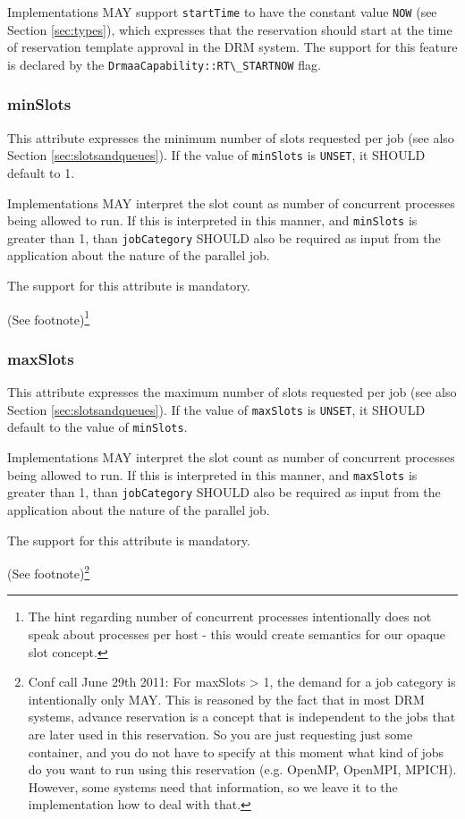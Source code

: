\documentclass{article}
\newcommand{\h}[1]{\lstinline|#1|}
\newcommand{\rat}[1]{ {\tiny(See footnote)}\footnote{#1} }
\begin{document}
Implementations MAY support \h{startTime} to have the constant value \h{NOW} (see Section \ref{sec:types}), which expresses that the reservation should start at the time of reservation template approval in the DRM system. The support for this feature is declared by the \h{DrmaaCapability::RT\_STARTNOW} flag. 

\subsubsection{minSlots}

This attribute expresses the minimum number of slots requested per job (see also Section \ref{sec:slotsandqueues}). If the value of \h{minSlots} is \h{UNSET}, it SHOULD default to 1.

Implementations MAY interpret the slot count as number of concurrent processes being allowed to run. If this is interpreted in this manner, and \h{minSlots} is greater than 1, than \h{jobCategory} SHOULD also be required as input from the application about the nature of the parallel job.

The support for this attribute is mandatory.

\rat{The hint regarding number of concurrent processes intentionally does not speak about processes per host - this would create semantics for our opaque slot concept.}

\subsubsection{maxSlots}

This attribute expresses the maximum number of slots requested per job (see also Section \ref{sec:slotsandqueues}). If the value of \h{maxSlots} is \h{UNSET}, it SHOULD default to the value of \h{minSlots}.

Implementations MAY interpret the slot count as number of concurrent processes being allowed to run. If this is interpreted in this manner, and \h{maxSlots} is greater than 1, than \h{jobCategory} SHOULD also be required as input from the application about the nature of the parallel job.

The support for this attribute is mandatory.

\rat{Conf call June 29th 2011: For maxSlots > 1, the demand for a job category is intentionally only MAY. This is reasoned by the fact that in most DRM systems,  advance reservation is a concept that is independent to the jobs that are later used in this reservation. So you are just requesting just some container, and you do not have to specify at this moment what kind of jobs do you want to run using this reservation (e.g. OpenMP, OpenMPI, MPICH). However, some systems need that information, so we leave it to the implementation how to deal with that.
}
\end{document}
